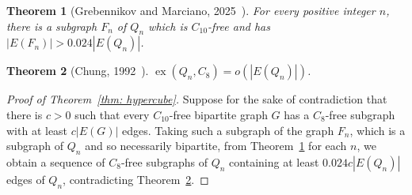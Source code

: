 \documentclass[A4paper,reqno,oneside,11pt]{amsart}
\theoremstyle{plain}
\newtheorem{theorem}{Theorem}[section]
\theoremstyle{definition}
\newcommand{\ex}{\operatorname{ex}}
\begin{document}
\begin{theorem}[Grebennikov and Marciano, 2025~\cite{GM25}]
\label{thm: GM25}
    For every positive integer $n$,
    there is a subgraph $F_n$ of $Q_n$ which is $C_{10}$-free and has $|E(F_n)| > 0.024 |E(Q_n)|$.
\end{theorem}

\begin{theorem}[Chung, 1992~\cite{Chung}]
\label{thm: C10}
    $\ex(Q_n,C_8) = o(|E(Q_n)|)$.
\end{theorem}

\begin{proof}[Proof of Theorem~\ref{thm: hypercube}]
    Suppose for the sake of contradiction that there is $c > 0$ such that every $C_{10}$-free bipartite graph $G$ has a $C_8$-free subgraph with at least $c|E(G)|$ edges.
    Taking such a subgraph of the graph $F_n$, which is a subgraph of $Q_n$ and so necessarily bipartite, from Theorem~\ref{thm: GM25} for each $n$, we obtain a sequence of $C_8$-free subgraphs of $Q_n$ containing at least $0.024 c |E(Q_n)|$ edges of $Q_n$, contradicting Theorem~\ref{thm: C10}.
\end{proof}
\end{document}
